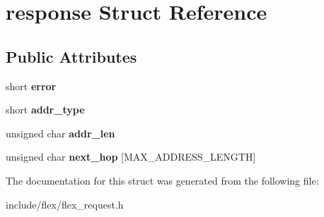 \hypertarget{structresponse}{}\section{response Struct Reference}
\label{structresponse}
\subsection*{Public Attributes}
\begin{DoxyCompactItemize}
\item 
short {\bfseries error}\hypertarget{structresponse_ae098504ec8fd2c1eafd3b8487a783575}{}\label{structresponse_ae098504ec8fd2c1eafd3b8487a783575}

\item 
short {\bfseries addr\+\_\+type}\hypertarget{structresponse_a2f45198ba85a80efc09cbde6098af0b8}{}\label{structresponse_a2f45198ba85a80efc09cbde6098af0b8}

\item 
unsigned char {\bfseries addr\+\_\+len}\hypertarget{structresponse_a835f830c6f09ed6b0e702b3021f66a57}{}\label{structresponse_a835f830c6f09ed6b0e702b3021f66a57}

\item 
unsigned char {\bfseries next\+\_\+hop} \mbox{[}M\+A\+X\+\_\+\+A\+D\+D\+R\+E\+S\+S\+\_\+\+L\+E\+N\+G\+TH\mbox{]}\hypertarget{structresponse_a6b7eac313932e975cd88a0d998867bb3}{}\label{structresponse_a6b7eac313932e975cd88a0d998867bb3}

\end{DoxyCompactItemize}


The documentation for this struct was generated from the following file\+:\begin{DoxyCompactItemize}
\item 
include/flex/flex\+\_\+request.\+h\end{DoxyCompactItemize}
